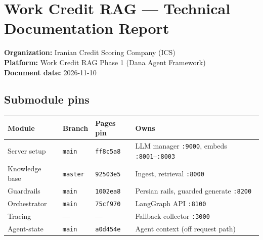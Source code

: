 \chapter{Work Credit RAG --- Technical Documentation Report}\label{work-credit-rag-technical-documentation-report}

\textbf{Organization:} Iranian Credit Scoring Company (ICS)\\
\textbf{Platform:} Work Credit RAG Phase 1 (Dana Agent Framework)\\
\textbf{Document date:} 2026-11-10

\section{Submodule pins}\label{submodule-pins}

\begin{longtable}[]{@{}
  >{\raggedright\arraybackslash}p{}
  >{\raggedright\arraybackslash}p{}
  >{\raggedright\arraybackslash}p{}
  >{\raggedright\arraybackslash}p{}@{}}
\toprule\noalign{}
Module & Branch & Pages pin & Owns \\
\midrule\noalign{}
\endhead
\bottomrule\noalign{}
\endlastfoot
Server setup & \texttt{main} & \texttt{ff8c5a8} & LLM manager \texttt{:9000}, embeds \texttt{:8001}--\texttt{:8003} \\
Knowledge base & \texttt{master} & \texttt{92503e5} & Ingest, retrieval \texttt{:8000} \\
Guardrails & \texttt{main} & \texttt{1002ea8} & Persian rails, guarded generate \texttt{:8200} \\
Orchestrator & \texttt{main} & \texttt{75cf970} & LangGraph API \texttt{:8100} \\
Tracing & --- & --- & Fallback collector \texttt{:3000} \\
Agent-state & \texttt{main} & \texttt{a0d454e} & Agent context (off request path) \\
\end{longtable}
